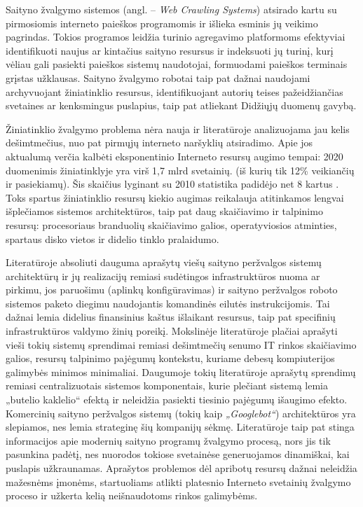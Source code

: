     Saityno žvalgymo sistemos (angl. -- \textit{Web Crawling Systems}) atsirado kartu su pirmosiomis interneto paieškos programomis ir išlieka esminis jų veikimo pagrindas. Tokios programos leidžia turinio agregavimo platformoms efektyviai identifikuoti naujus ar kintačius saityno resursus ir indeksuoti jų turinį, kurį vėliau gali pasiekti paieškos sistemų naudotojai, formuodami paieškos terminais grįstas užklausas. Saityno žvalgymo robotai taip pat dažnai naudojami archyvuojant žiniatinklio resursus, identifikuojant autorių teises pažeidžiančias svetaines ar kenksmingus puslapius, taip pat atliekant Didžiųjų duomenų gavybą.
    
    
    Žiniatinklio žvalgymo problema nėra nauja ir literatūroje analizuojama jau kelis dešimtmečius, nuo pat pirmųjų interneto naršyklių atsiradimo. Apie jos aktualumą verčia kalbėti eksponentinio Interneto resursų augimo tempai: 2020 duomenimis žiniatinklyje yra virš 1,7 mlrd svetainių. (iš kurių tik 12\% veikiančių ir pasiekiamų). Šis skaičius lyginant su 2010 statistika padidėjo net 8 kartus \cite{InternetLiveStats}. Toks spartus žiniatinklio resursų kiekio augimas reikalauja atitinkamos lengvai išplečiamos sistemos architektūros, taip pat daug skaičiavimo ir talpinimo resursų: procesoriaus branduolių skaičiavimo galios, operatyviosios atminties, spartaus disko vietos ir didelio tinklo pralaidumo.
    
    
    Literatūroje absoliuti dauguma aprašytų viešų saityno peržvalgos sistemų architektūrų ir jų realizacijų remiasi sudėtingos infrastruktūros nuoma ar pirkimu, jos paruošimu (aplinkų konfigūravimas) ir saityno peržvalgos roboto sistemos paketo diegimu naudojantis komandinės eilutės instrukcijomis. Tai dažnai lemia didelius finansinius kaštus išlaikant resursus, taip pat specifinių infrastruktūros valdymo žinių poreikį. Mokslinėje literatūroje plačiai aprašyti vieši tokių sistemų sprendimai remiasi dešimtmečių senumo IT rinkos skaičiavimo galios, resursų talpinimo pajėgumų kontekstu, kuriame debesų kompiuterijos galimybės minimos minimaliai. Daugumoje tokių literatūroje aprašytų sprendimų remiasi centralizuotais sistemos komponentais, kurie plečiant sistemą lemia „butelio kaklelio“ efektą ir neleidžia pasiekti tiesinio pajėgumų išaugimo efekto. Komercinių saityno peržvalgos sistemų (tokių kaip \textit{„Googlebot“}) architektūros yra slepiamos, nes lemia strateginę šių kompanijų sėkmę. Literatūroje taip pat stinga informacijos apie modernių saityno programų žvalgymo procesą, nors jis tik pasunkina padėtį, nes nuorodos tokiose svetainėse generuojamos dinamiškai, kai puslapis užkraunamas. Aprašytos problemos dėl apribotų resursų dažnai neleidžia mažesnėms įmonėms, startuoliams atlikti platesnio Interneto svetainių žvalgymo proceso ir užkerta kelią neišnaudotoms rinkos galimybėms. 
    

